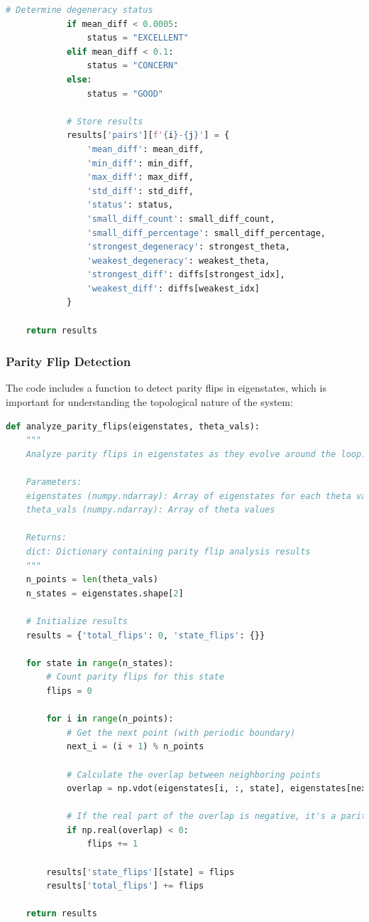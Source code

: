 \documentclass[12pt,a4paper]{article}
\begin{document}
\begin{lstlisting}[language=Python, caption=Eigenstate Degeneracy Analysis]
            # Determine degeneracy status
            if mean_diff < 0.0005:
                status = "EXCELLENT"
            elif mean_diff < 0.1:
                status = "CONCERN"
            else:
                status = "GOOD"
            
            # Store results
            results['pairs'][f'{i}-{j}'] = {
                'mean_diff': mean_diff,
                'min_diff': min_diff,
                'max_diff': max_diff,
                'std_diff': std_diff,
                'status': status,
                'small_diff_count': small_diff_count,
                'small_diff_percentage': small_diff_percentage,
                'strongest_degeneracy': strongest_theta,
                'weakest_degeneracy': weakest_theta,
                'strongest_diff': diffs[strongest_idx],
                'weakest_diff': diffs[weakest_idx]
            }
    
    return results
\end{lstlisting}

\subsubsection{Parity Flip Detection}

The code includes a function to detect parity flips in eigenstates, which is important for understanding the topological nature of the system:

\begin{lstlisting}[language=Python, caption=Parity Flip Detection]
def analyze_parity_flips(eigenstates, theta_vals):
    """
    Analyze parity flips in eigenstates as they evolve around the loop.
    
    Parameters:
    eigenstates (numpy.ndarray): Array of eigenstates for each theta value
    theta_vals (numpy.ndarray): Array of theta values
    
    Returns:
    dict: Dictionary containing parity flip analysis results
    """
    n_points = len(theta_vals)
    n_states = eigenstates.shape[2]
    
    # Initialize results
    results = {'total_flips': 0, 'state_flips': {}}
    
    for state in range(n_states):
        # Count parity flips for this state
        flips = 0
        
        for i in range(n_points):
            # Get the next point (with periodic boundary)
            next_i = (i + 1) % n_points
            
            # Calculate the overlap between neighboring points
            overlap = np.vdot(eigenstates[i, :, state], eigenstates[next_i, :, state])
            
            # If the real part of the overlap is negative, it's a parity flip
            if np.real(overlap) < 0:
                flips += 1
        
        results['state_flips'][state] = flips
        results['total_flips'] += flips
    
    return results
\end{lstlisting}
\end{document}
